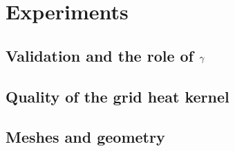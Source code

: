 \section{Experiments}
\label{sec:experiments}

\subsection{Validation and the role of \texorpdfstring{$\gamma$}{gamma}}
\label{sec:exp:sinkhorn}

\subsection{Quality of the grid heat kernel}
\label{sec:exp:grid}

\subsection{Meshes and geometry}
\label{sec:exp:meshes}
